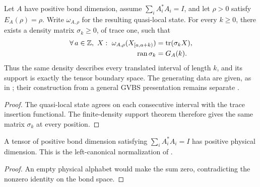 \begin{lemma}
    \label{thm:faithful_quasi_local_state_density_support}
    \leanok
    Let $A$ have positive bond dimension, assume
    $\sum_iA_i^*A_i=I$, and let $\rho>0$ satisfy $E_A(\rho)=\rho$.
    Write $\omega_{A,\rho}$ for the resulting quasi-local state.
    For every $k\geq0$, there exists a density matrix $\sigma_k\geq0$,
    of trace one, such that
    \begin{align}
        \forall\,a\in\mathbb Z,\ X:\ \omega_{A,\rho}(X_{[a,a+k)})
                                   & =\operatorname{tr}(\sigma_kX),\notag \\
        \operatorname{ran}\sigma_k & =G_A(k).\notag
    \end{align}
    Thus the same density describes every translated interval of length
    $k$, and its support is exactly the tensor boundary space.
    The generating data are given, as in
    \cite[Section~3 and the overlap proof in Section~4]{Nachtergaele1996Spectral};
    their construction from a general GVBS presentation remains separate
    \cite{gap:nachtergaele96_infinite_volume_ground_projection}.
\end{lemma}
\begin{proof}\leanok
    The quasi-local state agrees on each consecutive interval with the
    trace insertion functional. The finite-density support theorem
    therefore gives the same matrix $\sigma_k$ at every position.
\end{proof}

\begin{lemma}
    \label{thm:left_canonical_physical_dimension}
    \leanok
    A tensor of positive bond dimension satisfying
    $\sum_iA_i^*A_i=I$ has positive physical dimension.
    This is the left-canonical normalization of
    \cite[Section~2.1]{DeLasCuevas2017Irreducible}.
\end{lemma}
\begin{proof}\leanok
    An empty physical alphabet would make the sum zero, contradicting the
    nonzero identity on the bond space.
\end{proof}

